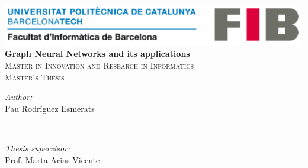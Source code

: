 \begin{titlepage}

\newcommand{\HRule}{\rule{\linewidth}{0.5mm}} 							%
\newenvironment{bottompar}{\par\vspace*{\fill}}{\clearpage}
\center 
\begin{center}
\includegraphics[scale=0.8]{./img/upclogo.png}\\[5cm] %
 


{ \huge \bfseries Graph Neural Networks and its applications}\\[0.4cm] %
\textsc{\Large Master in Innovation and Research in Informatics}\\[0.5cm] %
\textsc{\large Master's Thesis}\\[3cm] %

 
\begin{bottompar}
\begin{minipage}{0.5\textwidth}
\begin{flushleft} \large
\emph{Author:}\\ Pau Rodríguez Esmerats %
\end{flushleft}
\end{minipage}
~
\begin{minipage}{0.4\textwidth}
\begin{flushright} \large
\emph{Thesis supervisor:} \\
 Prof. Marta Arias Vicente   %
\end{flushright}
\end{minipage}\\[2cm]


\end{bottompar}
\end{center}
\end{titlepage}
